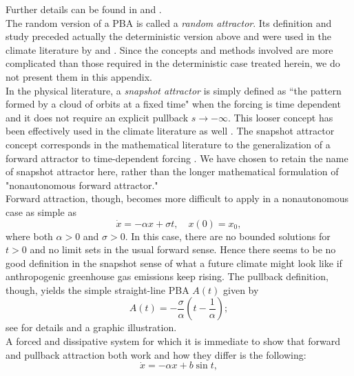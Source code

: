 \documentclass[%
 aip, cha,
 amsmath,amssymb,
 reprint,%
author-year,%
]{revtex4-1}
\newcommand{\0}{\mathbf 0}
\begin{document}
Further details can be found in \cite{Car.Han.2016} and \cite{Kloeden.Yang.2020}. \\
The random version of a PBA is called a {\em random attractor}. Its definition and study preceded actually the deterministic version above \citep{Crauel.Flan.1994} and were used in the climate literature by \cite{ghil_PBA} and \cite{chekroun}. Since the concepts and methods involved are more complicated than those required in the deterministic case treated herein, we do not present them in this appendix. \\
In the physical literature, a {\em snapshot attractor} is simply defined as ``the pattern formed by a cloud of orbits at a fixed time" when the forcing is time dependent \citep{Namenson.ea.1996} and it does not require an explicit pullback $s \to - \infty$. This looser concept has been effectively used in the climate literature as well \citep{drotos, Tel.ea.2020}. The snapshot attractor concept corresponds in the mathematical literature to the generalization of a forward attractor to time-dependent forcing \citep{Car.Han.2016, Kloeden.Yang.2020}. We have chosen to retain the name of snapshot attractor here, rather than the longer mathematical formulation of "nonautonomous forward attractor." \\
Forward attraction, though, becomes more difficult to apply in a nonautonomous case as simple as 
\begin{equation} \label{eq:monotone}
\dot x = - \alpha x + \sigma t, \quad x(0) = x_0, \tag{A2}
\end{equation}
where both $ \alpha > 0$ and  $ \sigma > 0$. In this case, there are no bounded solutions for $t >0$ and no limit sets in the usual forward sense. Hence there seems to be no good definition in the snapshot sense of what a future climate might look like if anthropogenic greenhouse gas emissions keep rising. The pullback definition, though, yields the simple straight-line PBA $A(t)$ given by
\begin{equation}
	{A(t)} = - \frac{\sigma}{\alpha} \left( t - \frac{1}{\alpha} \right); \tag{A3}
\end{equation}
see \cite{Ghil.RDS.2021} for details and a graphic illustration. \\
A forced and dissipative system for which it is immediate to show that forward and pullback attraction both work and how they differ is the following:
\begin{equation}
    \dot x = - \alpha x + b \sin t ,
    \tag{A4}
    \label{pb}
\end{equation}
\end{document}
